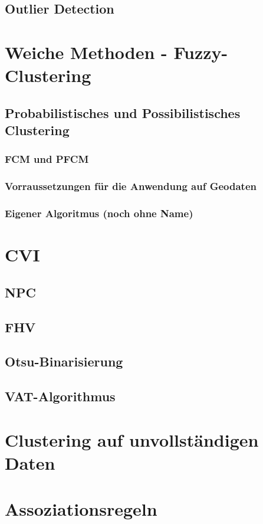 \documentclass[11pt,fleqn]{book}
\begin{document}
\subsection{Outlier Detection}


\section{Weiche Methoden - Fuzzy-Clustering}
\subsection{Probabilistisches und Possibilistisches Clustering}
\subsubsection{FCM und PFCM}
\subsubsection{Vorraussetzungen für die Anwendung auf Geodaten}
\subsubsection{Eigener Algoritmus (noch ohne Name)}

\section{CVI}
\subsection{NPC}
\subsection{FHV}
\subsection{Otsu-Binarisierung}
\subsection{VAT-Algorithmus}

\section{Clustering auf unvollständigen Daten}

\section{Assoziationsregeln}
\end{document}
